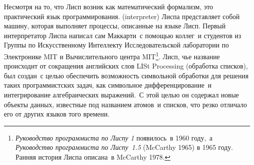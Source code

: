 Несмотря на то, что Лисп возник как математический
формализм, это практический язык программирования.
 (interpreter) Лиспа представляет
собой машину, 
которая выполняет процессы, описанные на языке Лисп.
Первый интерпретатор Лиспа написал сам Маккарти~с помощью
коллег~и студентов из Группы по Искусственному Интеллекту
 Исследовательской лаборатории по Электронике MIT и
Вычислительного центра MIT\footnote{{\em Руководство программиста по Лиспу 1} появилось~в 1960 году,~а {\em Руководство
программиста по Лиспу~1.5} (McCarthy 1965) в 1965 году.  Ранняя история Лиспа описана~в 
McCarthy 1978.
}.
%
Лисп, чье название происходит от сокращения английских слов LISt
Processing (обработка списков), был создан~с целью обеспечить
возможность символьной обработки для решения таких программистских
задач, как символьное дифференцирование~и интегрирование
алгебраических выражений.~С этой целью он содержал новые объекты данных, 
известные под названием атомов~и списков, что резко отличало его от
других языков того времени.

